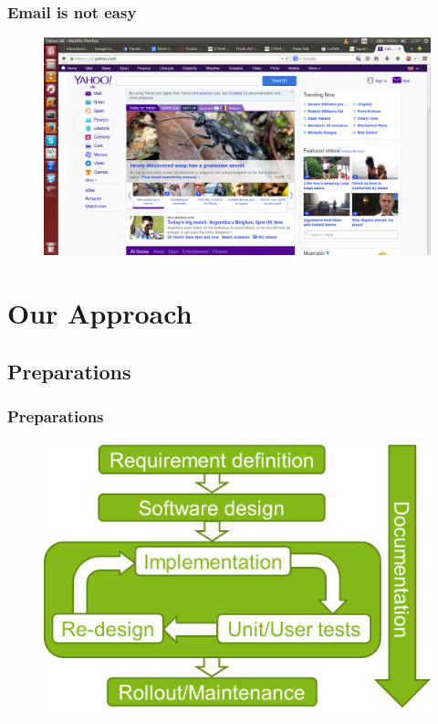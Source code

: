 \documentclass[9pt]{beamer}
\begin{document}
		\begin{frame}
			\frametitle{Email is not easy}
			\begin{figure}
				\centering
				\includegraphics[scale=0.2]{Images/yahoostart.png}
			\end{figure}
		\end{frame}
	
	\section{Our Approach}
		\subsection{Preparations}
		
		\begin{frame}
			\frametitle{Preparations}
			\begin{figure}
				\centering
				\includegraphics[scale=0.2]{Images/project_schedule_1.png}
			\end{figure}
		\end{frame}
		
\end{document}
